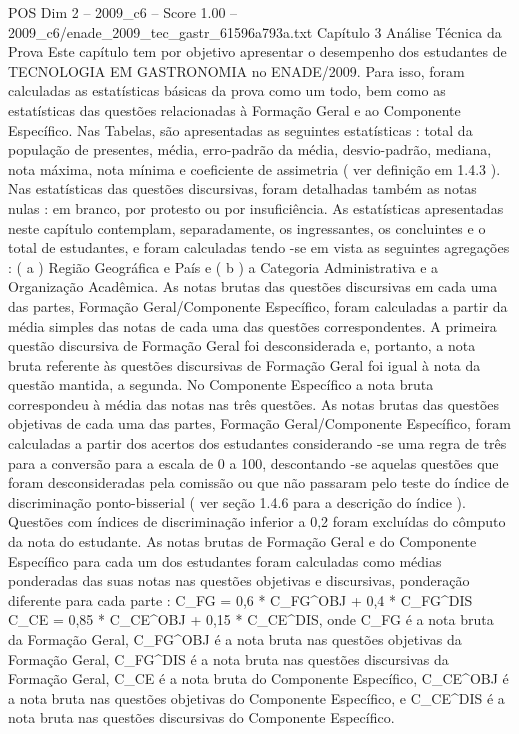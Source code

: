 \begin{textsample}{POS Dim 2 – 2009\_c6 – Score 1.00 – 2009\_c6/enade\_2009\_tec\_gastr\_61596a793a.txt}  \label{ex:f2_pos_296}
Capítulo 3 Análise Técnica da Prova Este capítulo tem por objetivo apresentar o desempenho dos estudantes de TECNOLOGIA EM GASTRONOMIA no ENADE/2009.
Para isso, foram calculadas as estatísticas básicas da prova como um todo, bem como as estatísticas das questões relacionadas à Formação Geral e ao Componente Específico.
Nas Tabelas, são apresentadas as seguintes estatísticas : total da população de presentes, média, erro-padrão da média, desvio-padrão, mediana, nota máxima, nota mínima e coeficiente de assimetria ( ver definição em 1.4.3 ).
Nas estatísticas das questões discursivas, foram detalhadas também as notas nulas : em branco, por protesto ou por insuficiência.
As estatísticas apresentadas neste capítulo contemplam, separadamente, os ingressantes, os concluintes e o total de estudantes, e foram calculadas tendo -se em vista as seguintes agregações : ( a ) Região Geográfica e País e ( b ) a Categoria Administrativa e a Organização Acadêmica.
As notas brutas das questões discursivas em cada uma das partes, Formação Geral/Componente Específico, foram calculadas a partir da média simples das notas de cada uma das questões correspondentes.
A primeira questão discursiva de Formação Geral foi desconsiderada e, portanto, a nota bruta referente às questões discursivas de Formação Geral foi igual à nota da questão mantida, a segunda.
No Componente Específico a nota bruta correspondeu à média das notas nas três questões.
As notas brutas das questões objetivas de cada uma das partes, Formação Geral/Componente Específico, foram calculadas a partir dos acertos dos estudantes considerando -se uma regra de três para a conversão para a escala de 0 a 100, descontando -se aquelas questões que foram desconsideradas pela comissão ou que não passaram pelo teste do índice de discriminação ponto-bisserial ( ver seção 1.4.6 para a descrição do índice ).
Questões com índices de discriminação inferior a 0,2 foram excluídas do cômputo da nota do estudante.
As notas brutas de Formação Geral e do Componente Específico para cada um dos estudantes foram calculadas como médias ponderadas das suas notas nas questões objetivas e discursivas, ponderação diferente para cada parte : C\_FG = 0,6 * C\_FG\textasciicircum{}OBJ + 0,4 * C\_FG\textasciicircum{}DIS C\_CE = 0,85 * C\_CE\textasciicircum{}OBJ + 0,15 * C\_CE\textasciicircum{}DIS, onde C\_FG é a nota bruta da Formação Geral, C\_FG\textasciicircum{}OBJ é a nota bruta nas questões objetivas da Formação Geral, C\_FG\textasciicircum{}DIS é a nota bruta nas questões discursivas da Formação Geral, C\_CE é a nota bruta do Componente Específico, C\_CE\textasciicircum{}OBJ é a nota bruta nas questões objetivas do Componente Específico, e C\_CE\textasciicircum{}DIS é a nota bruta nas questões discursivas do Componente Específico.

\end{textsample}
